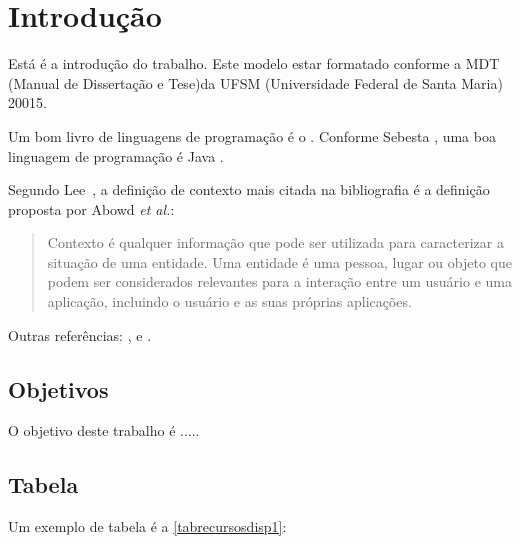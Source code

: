 \chapter{Introdução}
\label{chap:Introducao}

Está é a introdução do trabalho. Este modelo estar formatado conforme a MDT (Manual de Dissertação e Tese)da UFSM (Universidade Federal de Santa Maria) 20015. 

Um bom livro de linguagens de programação é o \cite{Sebesta:2005}. 
Conforme Sebesta \citeyearpar{Sebesta:2005}, uma boa linguagem de programação é Java \cite{Sun:2010}.

Segundo Lee~\citeyearpar{Lee:2009}, a definição de contexto mais citada na bibliografia é a definição
proposta por Abowd \textit{et al.}:

\begin{quote}
         Contexto é qualquer informação que pode ser utilizada 
         para caracterizar a situação de uma entidade. Uma entidade é uma pessoa, lugar ou objeto que 
         podem ser considerados relevantes para a interação entre um usuário e uma aplicação, 
         incluindo o usuário e as suas próprias aplicações. \citep[tradução nossa]{Abowd:1999}
\end{quote}

Outras referências: \cite{Alex:2010}, \cite{Weiser:1991} e \cite{norell:thesis}.

\section{Objetivos}
O objetivo deste trabalho é .....

\section{Tabela}
Um exemplo de tabela é a \ref{tabrecursosdisp1}:



